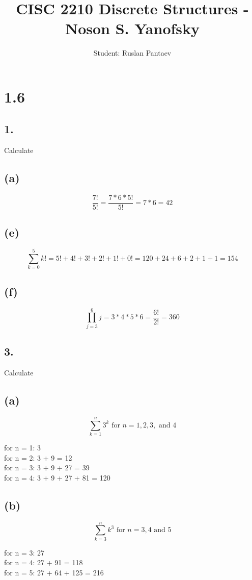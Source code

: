 \documentclass[11pt]{article}
\begin{document}
\title{CISC 2210 Discrete Structures - Noson S. Yanofsky}
\author{Student: Ruslan Pantaev}
\maketitle


\section*{1.6}
%
%
\subsection*{1.}
Calculate

\subsection*{(a)}
$$\frac{7!}{5!} = \frac{7 * 6 * 5!}{5!} = 7 * 6 = 42$$

\subsection*{(e)}
$$\sum_{k=0}^{5} k! = 5! + 4! + 3! + 2! + 1! + 0! = 120 + 24 + 6 + 2 + 1 + 1 = 154$$

\subsection*{(f)}
$$\prod_{j=3}^{6} j = 3*4*5*6 = \frac{6!}{2!} = 360$$
%
%
\subsection*{3.}
Calculate

\subsection*{(a)}
$$\sum_{k=1}^{n} 3^{k} \text{ for } n = 1,2,3, \text{ and } 4$$
\begin{center}
for n = 1: 3\\
for n = 2: 3 + 9 = 12\\
for n = 3: 3 + 9 + 27 = 39\\
for n = 4: 3 + 9 + 27 + 81 = 120\\
\end{center}

\subsection*{(b)}
$$\sum_{k=3}^{n} k^{3} \text{ for } n = 3,4 \text{ and } 5$$
\begin{center}
for n = 3: 27\\
for n = 4: 27 + 91 = 118\\
for n = 5: 27 + 64 + 125 = 216\\
\end{center} 
%
%
\end{document}

